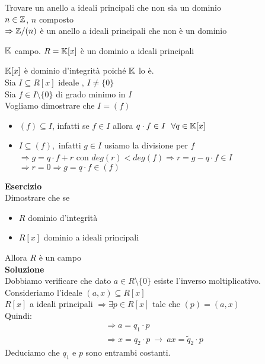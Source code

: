 \documentclass[12px]{article}
\begin{document}
Trovare un anello a ideali principali che non sia un dominio\\
$n\in\mathbb{Z}$,  $n$ composto\\
$ \Rightarrow \mathbb{Z}/(n)$ è un anello a ideali principali che non è un dominio
\begin{prop}
	$\mathbb{K}$ campo. $R = \mathbb{K}[x]$ è un dominio a ideali principali
\end{prop}
\begin{dimo}
	$\mathbb{K}[x]$ è dominio d'integrità poiché $\mathbb{K}$ lo è.\\
	Sia $I\subseteq R[x]$ ideale ,  $I\neq \{0\}$\\
	Sia $f\in I\setminus\{0\}$ di grado minimo in  $I$\\
	Vogliamo dimostrare che  $I = (f)$
	 \begin{itemize}
		 \item $(f) \subseteq I$, infatti se $f\in I$ allora $q\cdot f\in I \ \ \forall q\in \mathbb{K}[x]$
		 \item  $I\subseteq (f),$ infatti $g\in I$ usiamo la divisione per  $f$\\
			  $ \Rightarrow g = q\cdot f + r$ con $deg(r) < deg(f) \Rightarrow r = g - q\cdot f \in I$ \\
			  $ \Rightarrow r =0 \Rightarrow g = q\cdot f\in (f)$
	\end{itemize}

\end{dimo}
\textbf{Esercizio}\\
Dimostrare che se
\begin{itemize}
	\item $R$ dominio d'integrità
	\item $R[x]$ dominio a ideali principali
\end{itemize}
Allora $R$ è un campo\\
\textbf{Soluzione}\\
Dobbiamo verificare che dato $a\in R\setminus\{0\}$ esiste l'inverso moltiplicativo.\\
Consideriamo l'ideale $(a,x)\subseteq R[x]$\\
$R[x]$ a ideali principali $ \Rightarrow \exists p\in R[x]$ tale che $(p) = (a,x)$\\
Quindi:
\begin{gather*}
	\Rightarrow a = q_1\cdot p\\
	 \Rightarrow x = q_2\cdot p \ \rightarrow \ ax = \tilde q_2\cdot p
\end{gather*}
Deduciamo che $q_1$ e $p$ sono entrambi costanti.\\
\end{document}

